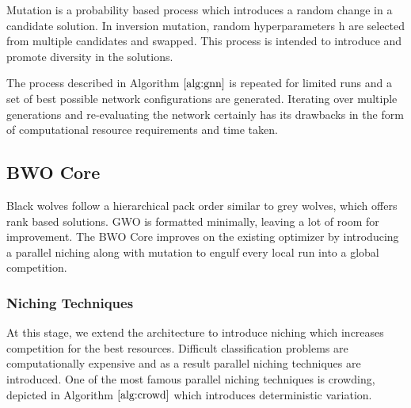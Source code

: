 \documentclass[conference]{IEEEtran}
\theoremstyle{definition}
\begin{document}
\begin{itemize}
Mutation is a probability based process which introduces a random change in a candidate solution. In inversion mutation, random hyperparameters $\textit{h}$ are selected from multiple candidates and swapped. This process is intended to introduce and promote diversity in the solutions. 

\end{itemize}
The process described in Algorithm $\ref{alg:gnn}$ is repeated for limited runs and a set of best possible network configurations are generated. Iterating over multiple generations and re-evaluating the network certainly has its drawbacks in the form of computational resource requirements and time taken. 

\subsection{BWO Core}
Black wolves follow a hierarchical pack order similar to grey wolves, which offers rank based solutions. GWO is formatted minimally, leaving a lot of room for improvement. The BWO Core improves on the existing optimizer by introducing a parallel niching along with mutation to engulf every local run into a global competition. 
\subsubsection{Niching Techniques}
At this stage, we extend the architecture to introduce niching which increases competition for the best resources. Difficult classification problems are computationally expensive and as a result parallel niching techniques are introduced. One of the most famous parallel niching techniques is crowding, depicted in Algorithm $\ref{alg:crowd}$ which introduces deterministic variation. 
\end{document}
